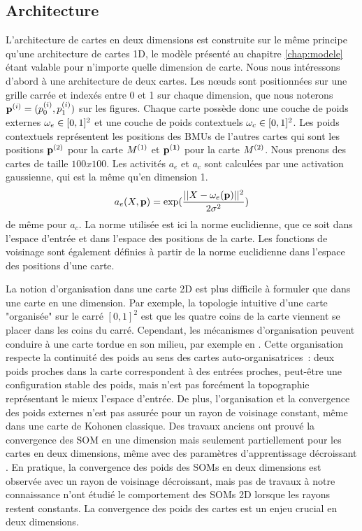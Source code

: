 \documentclass[../main]{subfiles}
\begin{document}
\subsection{Architecture}

L'architecture de cartes en deux dimensions est construite sur le même principe qu'une architecture de cartes 1D, le modèle présenté au chapitre \ref{chap:modele} étant valable pour n'importe quelle dimension de carte.
Nous nous intéressons d'abord à une architecture de deux cartes. Les n\oe{}uds sont positionnées sur une grille carrée et indexés entre 0 et 1 sur chaque dimension, que nous noterons $\mathbf{p}^{({i})} = (p^{({i})}_0, p^{({i})}_1)$ sur les figures. 
Chaque carte possède donc une couche de poids externes $\omega_{e} \in [0,1]^2$ et une couche de poids contextuels $\omega_c \in [0,1]^2$.
Les poids contextuels représentent les positions des BMUs de l'autres cartes qui sont les positions $\mathbf{p}^{({2})}$ pour la carte $M^{({1})}$ et $\mathbf{p^{({1})}}$ pour la carte $M^{({2})}$. Nous prenons des cartes de taille $100x100$.
Les activités $a_e$ et $a_c$ sont calculées par une activation gaussienne, qui est la même qu'en dimension 1.
$$a_e(X,\mathbf{p}) = \exp(\frac{||X - \omega_e(\mathbf{p}) ||^2}{2\sigma^2})$$
de même pour $a_c$.
La norme utilisée est ici la norme euclidienne, que ce soit dans l'espace d'entrée et dans l'espace des positions de la carte.
Les fonctions de voisinage sont également définies à partir de la norme euclidienne dans l'espace des positions d'une carte.

La notion d'organisation dans une carte 2D est plus difficile à formuler que dans une carte en une dimension. 
Par exemple, la topologie intuitive d'une carte "organisée" sur le carré $[0,1]^2$ est que les quatre coins de la carte viennent se placer dans les coins du carré.
Cependant, les mécanismes d'organisation peuvent conduire à une carte tordue en son milieu, par exemple en \label{fig:torsion}. 
Cette organisation respecte la continuité des poids au sens des cartes auto-organisatrices~: deux poids proches dans la carte correspondent à des entrées proches, peut-être une configuration stable des poids, mais n'est pas forcément la topographie représentant le mieux l'espace d'entrée. 
De plus, l'organisation et la convergence des poids externes n'est pas assurée pour un rayon de voisinage constant, même dans une carte de Kohonen classique. Des travaux anciens ont prouvé la convergence des SOM en une dimension \cite{Cottrell1998TheoreticalAO} mais seulement partiellement pour les cartes en deux dimensions, même avec des paramètres d'apprentissage décroissant \cite{flanagan_self-organisation_1996}. En pratique, la convergence des poids des SOMs en deux dimensions est observée avec un rayon de voisinage décroissant, mais pas de travaux à notre connaissance n'ont étudié le comportement des SOMs 2D lorsque les rayons restent constants. La convergence des poids des cartes est un enjeu crucial en deux dimensions.
\end{document}

